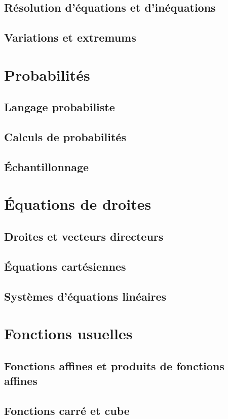 \documentclass[10pt,a4paper]{article}
\theoremstyle{definition}
\theoremstyle{definition}
\begin{document}
\subsection{Résolution d'équations et d'inéquations }
\subsection{Variations et extremums}

\section{Probabilités}
\subsection{Langage probabiliste}
\subsection{Calculs de probabilités}
\subsection{Échantillonnage}

\newpage

\section{Équations de droites}
\subsection{Droites et vecteurs directeurs}
\subsection{Équations cartésiennes}
\subsection{Systèmes d'équations linéaires}

\section{Fonctions usuelles}
\subsection{Fonctions affines et produits de fonctions affines}
\subsection{Fonctions carré et cube}
\end{document}
